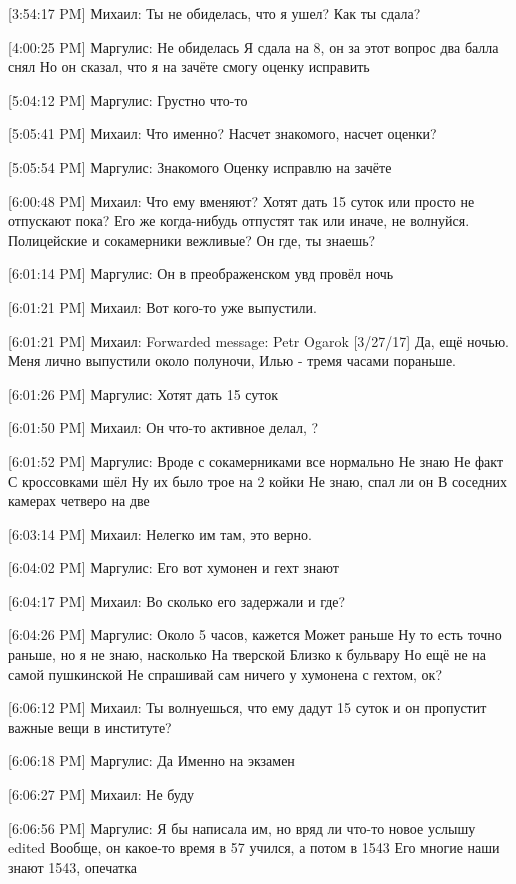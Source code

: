 \documentclass{article}
\begin{document}
[3:54:17 PM] Михаил:
Ты не обиделась, что я ушел? Как ты сдала?

[4:00:25 PM] Маргулис:
Не обиделась
 Я сдала на 8, он за этот вопрос два балла снял
 Но он сказал, что я на зачёте смогу оценку исправить

[5:04:12 PM] Маргулис:
Грустно что-то

[5:05:41 PM] Михаил:
Что именно? Насчет знакомого, насчет оценки?

[5:05:54 PM] Маргулис:
Знакомого
 Оценку исправлю на зачёте

[6:00:48 PM] Михаил:
Что ему вменяют? Хотят дать 15 суток или просто не отпускают пока? Его же когда-нибудь отпустят так или иначе, не волнуйся. Полицейские и сокамерники вежливые? Он где, ты знаешь?

[6:01:14 PM] Маргулис:
Он в преображенском увд провёл ночь

[6:01:21 PM] Михаил:
Вот кого-то уже выпустили.

[6:01:21 PM] Михаил:
Forwarded message: 
Petr Ogarok [3/27/17] 
Да, ещё ночью. Меня лично выпустили около полуночи, Илью - тремя часами пораньше.

[6:01:26 PM] Маргулис:
Хотят дать 15 суток

[6:01:50 PM] Михаил:
Он что-то активное делал,
 ?

[6:01:52 PM] Маргулис:
Вроде с сокамерниками все нормально
 Не знаю
 Не факт
 С кроссовками шёл
 Ну их было трое на 2 койки
 Не знаю, спал ли он
 В соседних камерах четверо на две

[6:03:14 PM] Михаил:
Нелегко им там, это верно.

[6:04:02 PM] Маргулис:
Его вот хумонен и гехт знают

[6:04:17 PM] Михаил:
Во сколько его задержали и где?

[6:04:26 PM] Маргулис:
Около 5 часов, кажется
 Может раньше
 Ну то есть точно раньше, но я не знаю, насколько
 На тверской
 Близко к бульвару
 Но ещё не на самой пушкинской
 Не спрашивай сам ничего у хумонена с гехтом, ок?

[6:06:12 PM] Михаил:
Ты волнуешься, что ему дадут 15 суток и он пропустит важные вещи в институте?

[6:06:18 PM] Маргулис:
Да
 Именно на экзамен

[6:06:27 PM] Михаил:
Не буду

[6:06:56 PM] Маргулис:
Я бы написала им, но вряд ли что-то новое услышу
edited 
Вообще, он какое-то время в 57 учился, а потом в 1543
Его многие наши знают
 1543, опечатка
\end{document}
